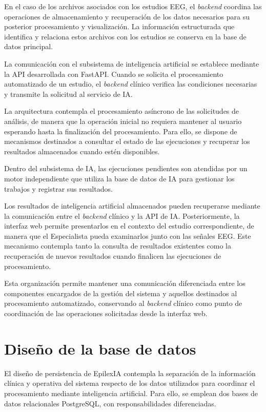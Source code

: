 En el caso de los archivos asociados con los
estudios EEG, el \textit{backend} coordina las operaciones
de almacenamiento y recuperación de los datos
necesarios para su posterior procesamiento
y visualización. La información estructurada
que identifica y relaciona estos archivos
con los estudios se conserva en la base de
datos principal.

La comunicación con el subsistema de inteligencia
artificial se establece mediante la API desarrollada
con FastAPI. Cuando se solicita el procesamiento
automatizado de un estudio, el \textit{backend} clínico
verifica las condiciones necesarias y transmite
la solicitud al servicio de IA.


La arquitectura contempla el procesamiento asíncrono de las solicitudes de análisis, de manera que la operación inicial no requiera mantener al usuario esperando hasta la finalización del procesamiento. Para ello, se dispone de mecanismos destinados a consultar el estado de las ejecuciones y recuperar los resultados almacenados cuando estén disponibles.


Dentro del subsistema de IA, las ejecuciones pendientes son atendidas por un motor independiente
que utiliza la base de datos de IA para gestionar
los trabajos y registrar sus resultados.


Los resultados de inteligencia artificial almacenados pueden recuperarse mediante la comunicación entre el \textit{backend} clínico y la API de IA. Posteriormente, la interfaz web permite presentarlos en el contexto del estudio correspondiente, de manera que el Especialista pueda examinarlos junto con las señales EEG. Este mecanismo contempla tanto la consulta de resultados existentes como la recuperación de nuevos resultados cuando finalicen las ejecuciones de procesamiento.


Esta organización permite mantener una
comunicación diferenciada entre los componentes
encargados de la gestión del sistema y aquellos
destinados al procesamiento automatizado,
conservando al \textit{backend} clínico como punto
de coordinación de las operaciones solicitadas
desde la interfaz web.


\section{Diseño de la base de datos}
\label{sec:diseno-base-datos}

El diseño de persistencia de EpilexIA contempla
la separación de la información clínica y operativa
del sistema respecto de los datos utilizados para
coordinar el procesamiento mediante inteligencia
artificial. Para ello, se emplean dos bases de datos
relacionales PostgreSQL, con responsabilidades
diferenciadas.

